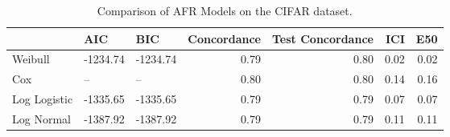 \begin{table*}
\centering
\caption{Comparison of AFR Models on the CIFAR dataset.}
\label{tab:cifar}
\begin{tabular}{lllrrrr}
\toprule
 & AIC & BIC & Concordance & Test Concordance & ICI & E50 \\
\midrule
Weibull & -1234.74 & -1234.74 & 0.79 & 0.80 & 0.02 & 0.02 \\
Cox & -- & -- & 0.80 & 0.80 & 0.14 & 0.16 \\
Log Logistic & -1335.65 & -1335.65 & 0.79 & 0.79 & 0.07 & 0.07 \\
Log Normal & -1387.92 & -1387.92 & 0.79 & 0.79 & 0.11 & 0.11 \\
\bottomrule
\end{tabular}
\end{table*}
